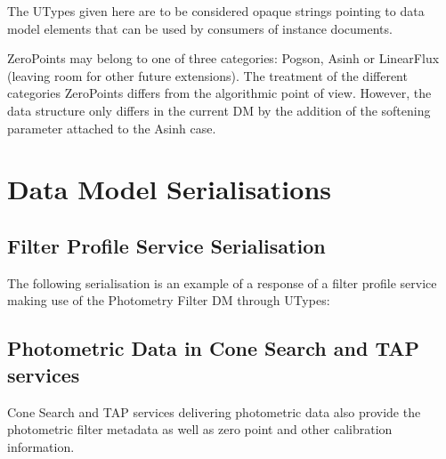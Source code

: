 \documentclass[11pt,a4paper]{ivoa}
\begin{document}
\begin{appendices}

The UTypes given here are to be considered opaque strings pointing to data model
elements that can be used by consumers of instance documents.

ZeroPoints may belong to one of three categories: Pogson, Asinh or LinearFlux
(leaving room for other future extensions). The treatment of the different
categories ZeroPoints differs from the algorithmic point of view.
However, the data structure only differs in the current DM by the addition
of the softening parameter attached to the Asinh case.

\par

\section{Data Model Serialisations} \label{serialisation}
\subsection{Filter Profile Service Serialisation} \label{serialisationfilter}


The following serialisation is an example of a response of a filter profile
service making use of the Photometry Filter DM through UTypes:
\par


\subsection{Photometric Data in Cone Search and TAP services}
Cone Search and TAP services delivering photometric data 
also provide the photometric filter metadata as well as zero point and other calibration information.


\end{appendices}
\end{document}
